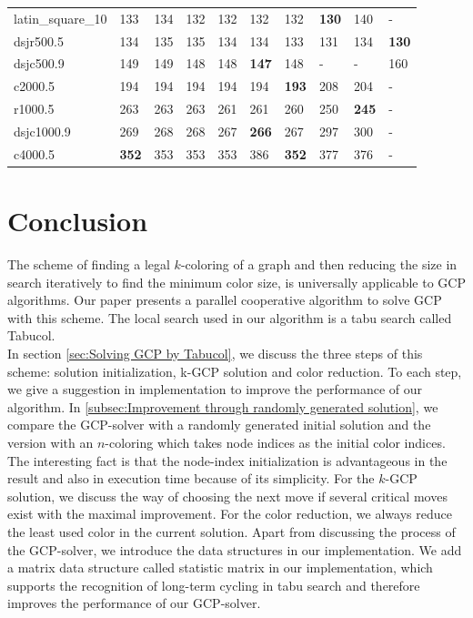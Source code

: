 \documentclass[12pt,a4paper,twoside]{scrartcl}
\numberwithin{equation}{section}
\begin{document}
\begin{table}[!htbp]
\begin{tabular}{|p{2.5cm} |p{1cm} p{1cm} p{1cm} p{1cm} p{1cm} p{1cm} p{1.8cm} p{1cm} p{1cm}|}
latin\_square\_10&133&134&132&132&132&132&\textbf{130}&140&-\\ 
dsjr500.5&134&135&135&134&134&133&131&134&\textbf{130}\\ 
dsjc500.9&149&149&148&148&\textbf{147}&148&-&-&160\\ 
c2000.5&194&194&194&194&194&\textbf{193}&208&204&-\\ \hline
r1000.5&263&263&263&261&261&260&250&\textbf{245}&-\\ 
dsjc1000.9&269&268&268&267&\textbf{266}&267&297&300&-\\ 
c4000.5&\textbf{352}&353&353&353&386&\textbf{352}&377&376&-\\ \hline

\end{tabular}
\end{table}
\clearpage
\section{Conclusion}
The scheme of finding a legal $k$-coloring of a graph and then reducing the size in search iteratively to find the minimum color size, is universally applicable to GCP algorithms. Our paper presents a parallel cooperative algorithm to solve GCP with this scheme. The local search used in our algorithm is a tabu search called Tabucol.\\

In section \ref{sec:Solving GCP by Tabucol}, we discuss the three steps of this scheme: solution initialization, k-GCP solution and color reduction. To each step, we  give a suggestion in implementation to improve the performance of our algorithm. In \ref{subsec:Improvement through randomly generated solution}, we compare the GCP-solver with a randomly generated initial solution and the version with an $n$-coloring which takes node indices as the initial color indices. The interesting fact is that the node-index initialization is advantageous in the result and also in execution time because of its simplicity. For the $k$-GCP solution, we discuss the way of choosing the next move if several critical moves exist with the maximal improvement. For the color reduction, we always reduce the least used color in the current solution. Apart from discussing the process of the GCP-solver, we introduce the data structures in our implementation. We add a matrix data structure called statistic matrix in our implementation, which supports the recognition of long-term cycling in tabu search and therefore improves the performance of our GCP-solver.\\
\end{document}
